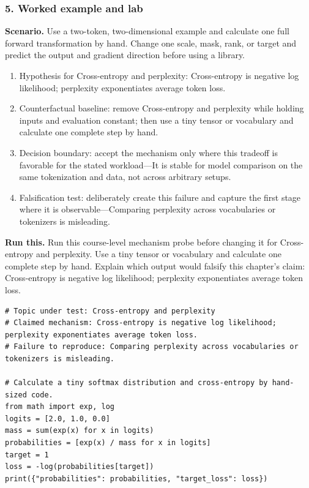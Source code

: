 \subsubsection*{5. Worked example and lab}
\textbf{Scenario.} Use a two-token, two-dimensional example and calculate one full forward transformation by hand. Change one scale, mask, rank, or target and predict the output and gradient direction before using a library.
\begin{enumerate}
\item Hypothesis for Cross-entropy and perplexity: Cross-entropy is negative log likelihood; perplexity exponentiates average token loss.
\item Counterfactual baseline: remove Cross-entropy and perplexity while holding inputs and evaluation constant; then use a tiny tensor or vocabulary and calculate one complete step by hand.
\item Decision boundary: accept the mechanism only where this tradeoff is favorable for the stated workload—It is stable for model comparison on the same tokenization and data, not across arbitrary setups.
\item Falsification test: deliberately create this failure and capture the first stage where it is observable—Comparing perplexity across vocabularies or tokenizers is misleading.
\end{enumerate}
\textbf{Run this.} Run this course-level mechanism probe before changing it for Cross-entropy and perplexity. Use a tiny tensor or vocabulary and calculate one complete step by hand. Explain which output would falsify this chapter's claim: Cross-entropy is negative log likelihood; perplexity exponentiates average token loss.
\begin{Verbatim}[fontsize=\scriptsize]
# Topic under test: Cross-entropy and perplexity
# Claimed mechanism: Cross-entropy is negative log likelihood; perplexity exponentiates average token loss.
# Failure to reproduce: Comparing perplexity across vocabularies or tokenizers is misleading.

# Calculate a tiny softmax distribution and cross-entropy by hand-sized code.
from math import exp, log
logits = [2.0, 1.0, 0.0]
mass = sum(exp(x) for x in logits)
probabilities = [exp(x) / mass for x in logits]
target = 1
loss = -log(probabilities[target])
print({"probabilities": probabilities, "target_loss": loss})
\end{Verbatim}
